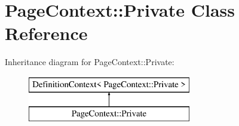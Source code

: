 \hypertarget{class_page_context_1_1_private}{}\section{Page\+Context\+::Private Class Reference}
\label{class_page_context_1_1_private}
Inheritance diagram for Page\+Context\+::Private\+:\begin{figure}[H]
\begin{center}
\leavevmode
\includegraphics[height=2.000000cm]{class_page_context_1_1_private}
\end{center}
\end{figure}
